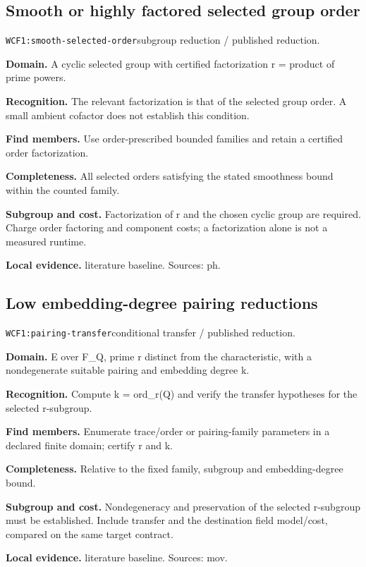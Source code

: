 \documentclass[10pt]{article}
\begin{document}
\subsection{Smooth or highly factored selected group order}
\texttt{WCF1:smooth-selected-order}\quad subgroup reduction / published reduction.\par
\textbf{Domain.} A cyclic selected group with certified factorization r = product of prime powers.\par
\textbf{Recognition.} The relevant factorization is that of the selected group order. A small ambient cofactor does not establish this condition.\par
\textbf{Find members.} Use order-prescribed bounded families and retain a certified order factorization.\par
\textbf{Completeness.} All selected orders satisfying the stated smoothness bound within the counted family.\par
\textbf{Subgroup and cost.} Factorization of r and the chosen cyclic group are required. Charge order factoring and component costs; a factorization alone is not a measured runtime.\par
\textbf{Local evidence.} literature baseline. Sources: ph.
\subsection{Low embedding-degree pairing reductions}
\texttt{WCF1:pairing-transfer}\quad conditional transfer / published reduction.\par
\textbf{Domain.} E over F\_Q, prime r distinct from the characteristic, with a nondegenerate suitable pairing and embedding degree k.\par
\textbf{Recognition.} Compute k = ord\_r(Q) and verify the transfer hypotheses for the selected r-subgroup.\par
\textbf{Find members.} Enumerate trace/order or pairing-family parameters in a declared finite domain; certify r and k.\par
\textbf{Completeness.} Relative to the fixed family, subgroup and embedding-degree bound.\par
\textbf{Subgroup and cost.} Nondegeneracy and preservation of the selected r-subgroup must be established. Include transfer and the destination field model/cost, compared on the same target contract.\par
\textbf{Local evidence.} literature baseline. Sources: mov.
\end{document}
